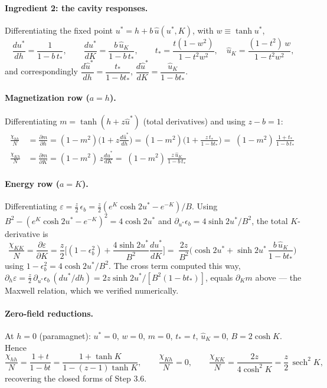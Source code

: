 \documentclass[11pt]{article}
\newcommand{\sech}{\operatorname{sech}}
\begin{document}
\paragraph{Ingredient 2: the cavity responses.}
Differentiating the fixed point $u^*=h+b\,\hat u(u^*,K)$, with $w\equiv\tanh u^*$,
\begin{equation}
\frac{du^*}{dh}=\frac{1}{1-b\,t_*},\qquad
\frac{du^*}{dK}=\frac{b\,\hat u_K}{1-b\,t_*},\qquad
t_*=\frac{t(1-w^2)}{1-t^2w^2},\quad
\hat u_K=\frac{(1-t^2)\,w}{1-t^2w^2},
\end{equation}
and correspondingly $\dfrac{d\hat u^*}{dh}=\dfrac{t_*}{1-bt_*}$, $\dfrac{d\hat u^*}{dK}=\dfrac{\hat u_K}{1-bt_*}$.

\paragraph{Magnetization row ($a=h$).}
Differentiating $m=\tanh(h+z\hat u^*)$ (total derivatives) and using $z-b=1$:
\begin{align}
\frac{\chi_{hh}}{N}&=\frac{\partial m}{\partial h}=(1-m^2)\Big(1+z\frac{d\hat u^*}{dh}\Big)
=(1-m^2)\Big(1+\frac{z\,t_*}{1-bt_*}\Big)
=\boxed{\;(1-m^2)\,\frac{1+t_*}{1-b\,t_*}\;}\\[4pt]
\frac{\chi_{Kh}}{N}&=\frac{\partial m}{\partial K}=(1-m^2)\,z\frac{d\hat u^*}{dK}
=\boxed{\;(1-m^2)\,\frac{z\,\hat u_K}{1-b\,t_*}\;}
\end{align}

\paragraph{Energy row ($a=K$).}
Differentiating $\varepsilon=\tfrac z2\,\epsilon_b=\tfrac z2 (e^K\cosh2u^*-e^{-K})/B$. Using
$B^2-(e^K\cosh2u^*-e^{-K})^2=4\cosh2u^*$ and $\partial_{u^*}\epsilon_b=4\sinh2u^*/B^2$, the total
$K$-derivative is
\begin{equation}
\frac{\chi_{KK}}{N}=\frac{\partial\varepsilon}{\partial K}
=\frac z2\Big[(1-\epsilon_b^2)+\frac{4\sinh2u^*}{B^2}\frac{du^*}{dK}\Big]
=\boxed{\;\frac{2z}{B^2}\Big(\cosh2u^*+\sinh2u^*\,\frac{b\,\hat u_K}{1-bt_*}\Big)\;}
\end{equation}
using $1-\epsilon_b^2=4\cosh2u^*/B^2$. The cross term computed this way,
$\partial_h\varepsilon=\tfrac z2\,\partial_{u^*}\epsilon_b\,(du^*/dh)=2z\sinh2u^*/[B^2(1-bt_*)]$,
equals $\partial_K m$ above --- the Maxwell relation, which we verified numerically.

\paragraph{Zero-field reductions.}
At $h=0$ (paramagnet): $u^*=0$, $w=0$, $m=0$, $t_*=t$, $\hat u_K=0$, $B=2\cosh K$. Hence
\begin{equation*}
\frac{\chi_{hh}}{N}=\frac{1+t}{1-bt}=\frac{1+\tanh K}{1-(z-1)\tanh K},\qquad
\frac{\chi_{Kh}}{N}=0,\qquad
\frac{\chi_{KK}}{N}=\frac{2z}{4\cosh^2K}=\frac z2\,\sech^2K,
\end{equation*}
recovering the closed forms of Step 3.6.
\end{document}
